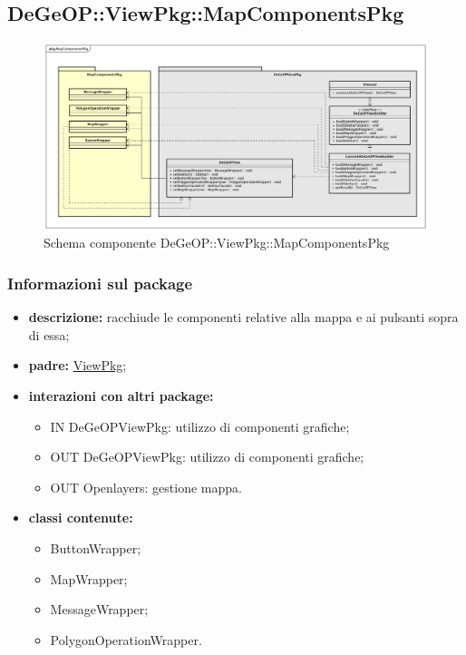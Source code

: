 \subsection{DeGeOP::ViewPkg::MapComponentsPkg}
\label{pkg::MapComponentsPkg}
\begin{figure}[H]
	\centering
	\includegraphics[width=\textwidth]{img/PkgDiagram/STMapComponentsPkg.png}
	\caption{Schema componente DeGeOP::ViewPkg::MapComponentsPkg}
\end{figure}
\subsubsection{Informazioni sul package}
\begin{itemize}
	\item \textbf{descrizione:} racchiude le componenti relative alla mappa e ai pulsanti sopra di essa;
	\item \textbf{padre:} \hyperref[pkg::ViewPkg]{ViewPkg};
	\item \textbf{interazioni con altri package:} 
	\begin{itemize}
		\item IN DeGeOPViewPkg: utilizzo di componenti grafiche;
		\item OUT DeGeOPViewPkg: utilizzo di componenti grafiche;
		\item OUT Openlayers: gestione mappa.
	\end{itemize}
	\item \textbf{classi contenute:}
	\begin{itemize}
		\item ButtonWrapper;
		\item MapWrapper;
		\item MessageWrapper;
		\item PolygonOperationWrapper.
	\end{itemize}
\end{itemize}
